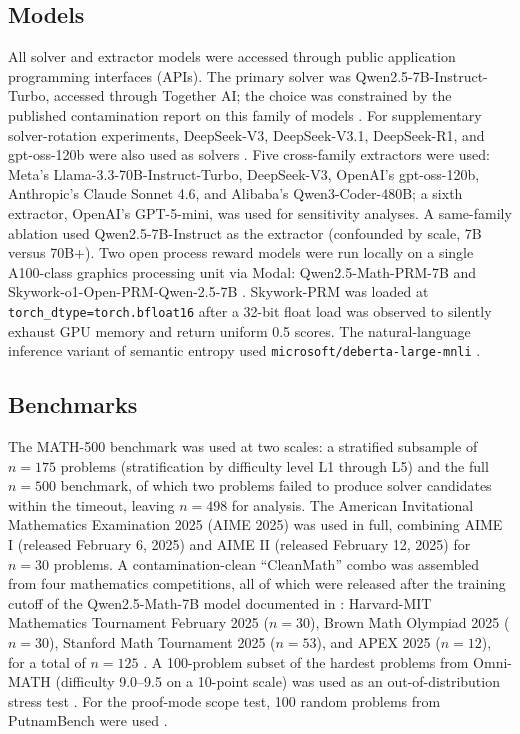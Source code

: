 \documentclass[11pt]{article}
\begin{document}
\subsection{Models}

All solver and extractor models were accessed through public application programming interfaces (APIs). The primary solver was Qwen2.5-7B-Instruct-Turbo, accessed through Together AI; the choice was constrained by the published contamination report on this family of models \citep{wu2025contam}. For supplementary solver-rotation experiments, DeepSeek-V3, DeepSeek-V3.1, DeepSeek-R1, and gpt-oss-120b were also used as solvers \citep{deepseek2025r1}. Five cross-family extractors were used: Meta's Llama-3.3-70B-Instruct-Turbo, DeepSeek-V3, OpenAI's gpt-oss-120b, Anthropic's Claude Sonnet 4.6, and Alibaba's Qwen3-Coder-480B; a sixth extractor, OpenAI's GPT-5-mini, was used for sensitivity analyses. A same-family ablation used Qwen2.5-7B-Instruct as the extractor (confounded by scale, 7B versus 70B+). Two open process reward models were run locally on a single A100-class graphics processing unit via Modal: Qwen2.5-Math-PRM-7B and Skywork-o1-Open-PRM-Qwen-2.5-7B \citep{qwenprm2025, skyworkprm2024}. Skywork-PRM was loaded at \texttt{torch\_dtype=torch.bfloat16} after a 32-bit float load was observed to silently exhaust GPU memory and return uniform 0.5 scores. The natural-language inference variant of semantic entropy used \texttt{microsoft/deberta-large-mnli} \citep{farquhar2024nature}.

\subsection{Benchmarks}

The MATH-500 benchmark \citep{hendrycks2021math, lightman2024prm} was used at two scales: a stratified subsample of $n=175$ problems (stratification by difficulty level L1 through L5) and the full $n=500$ benchmark, of which two problems failed to produce solver candidates within the timeout, leaving $n=498$ for analysis. The American Invitational Mathematics Examination 2025 (AIME 2025) was used in full, combining AIME I (released February 6, 2025) and AIME II (released February 12, 2025) for $n=30$ problems. A contamination-clean ``CleanMath'' combo was assembled from four mathematics competitions, all of which were released after the training cutoff of the Qwen2.5-Math-7B model documented in \citet{wu2025contam}: Harvard-MIT Mathematics Tournament February 2025 ($n=30$), Brown Math Olympiad 2025 ($n=30$), Stanford Math Tournament 2025 ($n=53$), and APEX 2025 ($n=12$), for a total of $n=125$ \citep{matharena2025}. A 100-problem subset of the hardest problems from Omni-MATH (difficulty 9.0--9.5 on a 10-point scale) was used as an out-of-distribution stress test \citep{omnimath2024}. For the proof-mode scope test, 100 random problems from PutnamBench were used \citep{amitayusht2024putnambench}.
\end{document}
